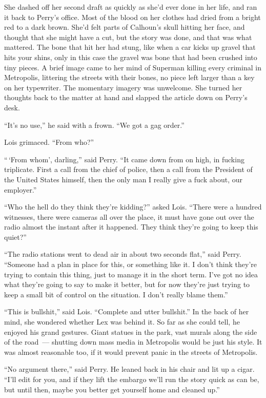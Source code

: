 \documentclass[ebook,12pt]{memoir}
\begin{document}
She dashed off her second draft as quickly as she'd ever done in her
life, and ran it back to Perry's office. Most of the blood on her
clothes had dried from a bright red to a dark brown. She'd felt parts of
Calhoun's skull hitting her face, and thought that she might have a cut,
but the story was done, and that was what mattered. The bone that hit
her had stung, like when a car kicks up gravel that hits your shins,
only in this case the gravel was bone that had been crushed into tiny
pieces. A brief image came to her mind of Superman killing every
criminal in Metropolis, littering the streets with their bones, no piece
left larger than a key on her typewriter. The momentary imagery was
unwelcome. She turned her thoughts back to the matter at hand and
slapped the article down on Perry's desk.

``It's no use,'' he said with a frown. ``We got a gag order.''

Lois grimaced. ``From who?''

``\,`From whom', darling,'' said Perry. ``It came down from on high, in
fucking triplicate. First a call from the chief of police, then a call
from the President of the United States himself, then the only man I
really give a fuck about, our employer.''

``Who the hell do they think they're kidding?'' asked Lois. ``There were
a hundred witnesses, there were cameras all over the place, it must have
gone out over the radio almost the instant after it happened. They think
they're going to keep this quiet?''

``The radio stations went to dead air in about two seconds flat,'' said
Perry. ``Someone had a plan in place for this, or something like it. I
don't think they're trying to contain this thing, just to manage it in
the short term. I've got no idea what they're going to say to make it
better, but for now they're just trying to keep a small bit of control
on the situation. I don't really blame them.''

``This is bullshit,'' said Lois. ``Complete and utter bullshit.'' In the
back of her mind, she wondered whether Lex was behind it. So far as she
could tell, he enjoyed his grand gestures. Giant statues in the park,
vast murals along the side of the road~--- shutting down mass media in
Metropolis would be just his style. It was almost reasonable too, if it
would prevent panic in the streets of Metropolis.

``No argument there,'' said Perry. He leaned back in his chair and lit
up a cigar. ``I'll edit for you, and if they lift the embargo we'll run
the story quick as can be, but until then, maybe you better get yourself
home and cleaned up.''
\end{document}
